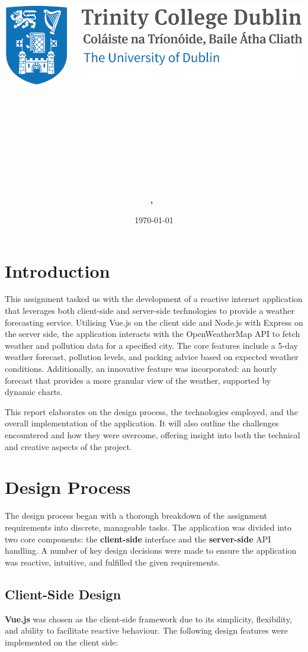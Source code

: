 \documentclass{article}
\title{
\includegraphics[width=0.4\linewidth]{reduced-trinity.png}\\
\hrulefill \\
\textmd{\textbf{\moduleCode\ \moduleName}}\\
\textmd{\textbf{\assignmentTitle}}\\
\hrulefill \\
}
\author{\textbf{\authorName,\ \authorID}}
\date{\today}
\begin{document}
\maketitle

\section*{Introduction}

This assignment tasked us with the development of a reactive internet application that leverages both client-side and server-side technologies to provide a weather forecasting service. Utilising Vue.js on the client side and Node.js with Express on the server side, the application interacts with the OpenWeatherMap API to fetch weather and pollution data for a specified city. The core features include a 5-day weather forecast, pollution levels, and packing advice based on expected weather conditions. Additionally, an innovative feature was incorporated: an hourly forecast that provides a more granular view of the weather, supported by dynamic charts.

This report elaborates on the design process, the technologies employed, and the overall implementation of the application. It will also outline the challenges encountered and how they were overcome, offering insight into both the technical and creative aspects of the project.

\section*{Design Process}

The design process began with a thorough breakdown of the assignment requirements into discrete, manageable tasks. The application was divided into two core components: the \textbf{client-side} interface and the \textbf{server-side} API handling. A number of key design decisions were made to ensure the application was reactive, intuitive, and fulfilled the given requirements.

\subsection*{Client-Side Design}

\textbf{Vue.js} was chosen as the client-side framework due to its simplicity, flexibility, and ability to facilitate reactive behaviour. The following design features were implemented on the client side:
\end{document}
